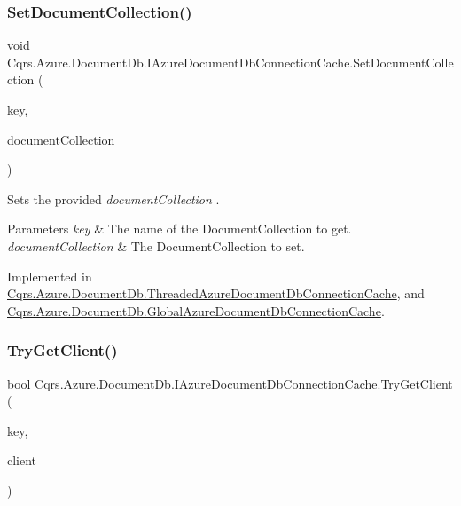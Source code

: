\subsubsection{\texorpdfstring{Set\+Document\+Collection()}{SetDocumentCollection()}}
{\footnotesize\ttfamily void Cqrs.\+Azure.\+Document\+Db.\+I\+Azure\+Document\+Db\+Connection\+Cache.\+Set\+Document\+Collection (\begin{DoxyParamCaption}\item[{string}]{key,  }\item[{Document\+Collection}]{document\+Collection }\end{DoxyParamCaption})}



Sets the provided {\itshape document\+Collection} . 


\begin{DoxyParams}{Parameters}
{\em key} & The name of the Document\+Collection to get.\\
\hline
{\em document\+Collection} & The Document\+Collection to set.\\
\hline
\end{DoxyParams}


Implemented in \hyperlink{classCqrs_1_1Azure_1_1DocumentDb_1_1ThreadedAzureDocumentDbConnectionCache_a069d9161ed5649cc3e65cda641d5173d_a069d9161ed5649cc3e65cda641d5173d}{Cqrs.\+Azure.\+Document\+Db.\+Threaded\+Azure\+Document\+Db\+Connection\+Cache}, and \hyperlink{classCqrs_1_1Azure_1_1DocumentDb_1_1GlobalAzureDocumentDbConnectionCache_a19c4bcbf0149036557fb8a3a3b687c79_a19c4bcbf0149036557fb8a3a3b687c79}{Cqrs.\+Azure.\+Document\+Db.\+Global\+Azure\+Document\+Db\+Connection\+Cache}.

\mbox{\label{interfaceCqrs_1_1Azure_1_1DocumentDb_1_1IAzureDocumentDbConnectionCache_a56a01a4224cb64d9349913e5237cebda_a56a01a4224cb64d9349913e5237cebda}} 
\subsubsection{\texorpdfstring{Try\+Get\+Client()}{TryGetClient()}}
{\footnotesize\ttfamily bool Cqrs.\+Azure.\+Document\+Db.\+I\+Azure\+Document\+Db\+Connection\+Cache.\+Try\+Get\+Client (\begin{DoxyParamCaption}\item[{string}]{key,  }\item[{out Document\+Client}]{client }\end{DoxyParamCaption})}




